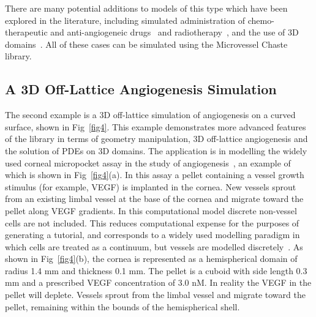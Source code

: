 \documentclass[10pt,letterpaper]{article}
\begin{document}
There are many potential additions to models of this type which have been explored in the literature, including simulated administration of chemo-therapeutic and anti-angiogeneic drugs~\cite{Alarcon2006} and radiotherapy~\cite{Grogan2016}, and the use of 3D domains~\cite{Perfahl2011}. All of these cases can be simulated using the Microvessel Chaste library.

\subsection*{A 3D Off-Lattice Angiogenesis Simulation}

The second example is a 3D off-lattice simulation of angiogenesis on a curved surface, shown in Fig~\ref{fig4}. This example demonstrates more advanced features of the library in terms of geometry manipulation, 3D off-lattice angiogenesis and the solution of PDEs on 3D domains. The application is in modelling the widely used corneal micropocket assay in the study of angiogenesis~\cite{Connor2015}, an example of which is shown in Fig~\ref{fig4}(a). In this assay a pellet containing a vessel growth stimulus (for example, VEGF) is implanted in the cornea. New vessels sprout from an existing limbal vessel at the base of the cornea and migrate toward the pellet along VEGF gradients. In this computational model discrete non-vessel cells are not included. This reduces computational expense for the purposes of generating a tutorial, and corresponds to a widely used modelling paradigm in which cells are treated as a continuum, but vessels are modelled discretely~\cite{Secomb2013}. As shown in Fig~\ref{fig4}(b), the cornea is represented as a hemispherical domain of radius 1.4 mm and thickness 0.1 mm. The pellet is a cuboid with side length 0.3 mm and a prescribed VEGF concentration of 3.0 nM. In reality the VEGF in the pellet will deplete. Vessels sprout from the limbal vessel and migrate toward the pellet, remaining within the bounds of the hemispherical shell.
\end{document}
